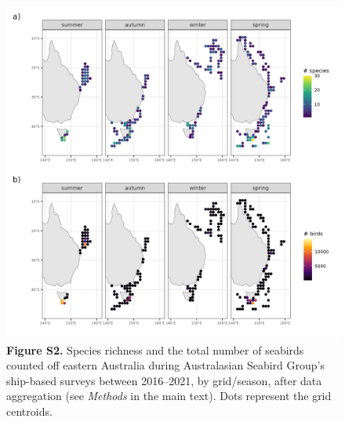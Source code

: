 \documentclass[
]{article}
\begin{document}
\begin{figure}
\centering
\includegraphics{../results/FigS2_map-effort-spp-richness-and-total-birds-seasons.png}
\caption{\textbf{Figure S2.} Species richness and the total number of
seabirds counted off eastern Australia during Australasian Seabird
Group's ship-based surveys between 2016--2021, by grid/season, after
data aggregation (see \emph{Methods} in the main text). Dots represent
the grid centroids.}
\end{figure}

\newpage
\end{document}
